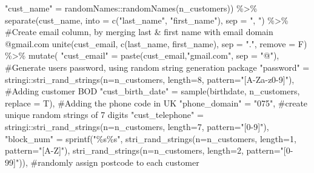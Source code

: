 \documentclass[
  letterpaper,
  DIV=11,
  numbers=noendperiod]{scrartcl}
\newenvironment{Shaded}{\begin{snugshade}}{\end{snugshade}}
\newcommand{\AttributeTok}[1]{\textcolor[rgb]{0.40,0.45,0.13}{#1}}
\newcommand{\CommentTok}[1]{\textcolor[rgb]{0.37,0.37,0.37}{#1}}
\newcommand{\DecValTok}[1]{\textcolor[rgb]{0.68,0.00,0.00}{#1}}
\newcommand{\FunctionTok}[1]{\textcolor[rgb]{0.28,0.35,0.67}{#1}}
\newcommand{\NormalTok}[1]{\textcolor[rgb]{0.00,0.23,0.31}{#1}}
\newcommand{\OtherTok}[1]{\textcolor[rgb]{0.00,0.23,0.31}{#1}}
\newcommand{\SpecialCharTok}[1]{\textcolor[rgb]{0.37,0.37,0.37}{#1}}
\newcommand{\StringTok}[1]{\textcolor[rgb]{0.13,0.47,0.30}{#1}}
\begin{document}
\begin{Shaded}
\begin{Highlighting}[numbers=left,,]
             \StringTok{"cust\_name"} \OtherTok{=}\NormalTok{ randomNames}\SpecialCharTok{::}\FunctionTok{randomNames}\NormalTok{(n\_customers)) }\SpecialCharTok{\%\textgreater{}\%} 
  \FunctionTok{separate}\NormalTok{(cust\_name, }\AttributeTok{into =} \FunctionTok{c}\NormalTok{(}\StringTok{"last\_name"}\NormalTok{, }\StringTok{"first\_name"}\NormalTok{), }\AttributeTok{sep =} \StringTok{", "}\NormalTok{) }\SpecialCharTok{\%\textgreater{}\%}
  \CommentTok{\#Create email column, by merging last \& first name with email domain @gmail.com}
  \FunctionTok{unite}\NormalTok{(cust\_email, }\FunctionTok{c}\NormalTok{(last\_name, first\_name), }\AttributeTok{sep =} \StringTok{"."}\NormalTok{, }\AttributeTok{remove =}\NormalTok{ F) }\SpecialCharTok{\%\textgreater{}\%}
  \FunctionTok{mutate}\NormalTok{(}
    \StringTok{"cust\_email"} \OtherTok{=} \FunctionTok{paste}\NormalTok{(cust\_email,}\StringTok{"gmail.com"}\NormalTok{, }\AttributeTok{sep =} \StringTok{"@"}\NormalTok{),}
    \CommentTok{\#Generate user\textquotesingle{}s password, using random string generation package}
    \StringTok{"password"} \OtherTok{=} 
\NormalTok{      stringi}\SpecialCharTok{::}\FunctionTok{stri\_rand\_strings}\NormalTok{(}\AttributeTok{n=}\NormalTok{n\_customers, }\AttributeTok{length=}\DecValTok{8}\NormalTok{, }\AttributeTok{pattern=}\StringTok{"[A{-}Za{-}z0{-}9]"}\NormalTok{),}
    \CommentTok{\#Adding customer BOD}
    \StringTok{"cust\_birth\_date"} \OtherTok{=} \FunctionTok{sample}\NormalTok{(birthdate, n\_customers, }\AttributeTok{replace =}\NormalTok{ T),}
    \CommentTok{\#Adding the phone code in UK}
    \StringTok{"phone\_domain"} \OtherTok{=} \StringTok{"075"}\NormalTok{,}
    \CommentTok{\#create unique random strings of 7 digits}
    \StringTok{"cust\_telephone"} \OtherTok{=} 
\NormalTok{      stringi}\SpecialCharTok{::}\FunctionTok{stri\_rand\_strings}\NormalTok{(}\AttributeTok{n=}\NormalTok{n\_customers, }\AttributeTok{length=}\DecValTok{7}\NormalTok{, }\AttributeTok{pattern=}\StringTok{"[0{-}9]"}\NormalTok{),}
    \StringTok{"block\_num"} \OtherTok{=} 
      \FunctionTok{sprintf}\NormalTok{(}\StringTok{"\%s\%s"}\NormalTok{, }
              \FunctionTok{stri\_rand\_strings}\NormalTok{(}\AttributeTok{n=}\NormalTok{n\_customers, }\AttributeTok{length=}\DecValTok{1}\NormalTok{, }\AttributeTok{pattern=}\StringTok{"[A{-}Z]"}\NormalTok{),}
              \FunctionTok{stri\_rand\_strings}\NormalTok{(}\AttributeTok{n=}\NormalTok{n\_customers, }\AttributeTok{length=}\DecValTok{2}\NormalTok{, }\AttributeTok{pattern=}\StringTok{"[0{-}99]"}\NormalTok{)),}
    \CommentTok{\#randomly assign postcode to each customer}

\end{Highlighting}
\end{Shaded}
\end{document}
